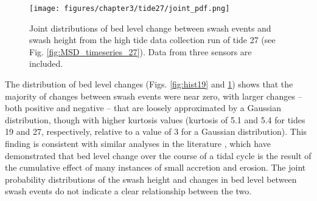 \begin{figure}[tbp] %
	\texttt{[image: figures/chapter3/tide27/joint\_pdf.png]}
	\caption[Joint distribution of bed level change and swash height, tide 27]{Joint distributions of bed level change between swash events and swash height from the high tide data collection run of tide 27 (see Fig. \ref{fig:MSD_timeseries_27}). Data from three sensors are included.}
	\label{fig:hist27}
\end{figure}

The distribution of bed level changes (Figs. \ref{fig:hist19} and \ref{fig:hist27}) shows that the majority of changes between swash events were near zero, with larger changes -- both positive and negative -- that are loosely approximated by a Gaussian distribution, though with higher kurtosis values (kurtosis of 5.1 and 5.4 for tides 19 and 27, respectively, relative to a value of 3 for a Gaussian distribution). This finding is consistent with similar analyses in the literature \citep[e.g.,][]{Horn_Walton2004, Turner_etal2008, Masselink_etal2009, Blenkinsopp_etal2011}, which have demonstrated that bed level change over the course of a tidal cycle is the result of the cumulative effect of many instances of small accretion and erosion. The joint probability distributions of the swash height and changes in bed level between swash events do not indicate a clear relationship between the two. %

